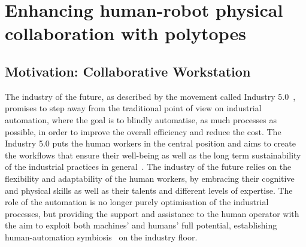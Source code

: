 
\chapter{Enhancing human-robot physical collaboration with polytopes}



\section{Motivation: Collaborative Workstation}
\label{ch:motivation_collaborative_workstation}
The industry of the future, as described by the movement called Industry 5.0~\cite{MADDIKUNTA2022ind50}, promises to step away from the traditional point of view on industrial automation, where the goal is to blindly automatise, as much processes as possible, in order to improve the overall efficiency and reduce the cost. The Industry 5.0 puts the human workers in the central position and aims to create the workflows that ensure their well-being as well as the long term sustainability of the industrial practices in general~\cite{XU2021ind50}. The industry of the future relies on the flexibility and adaptability of the human workers, by embracing their cognitive and physical skills as well as their talents and different levels of expertise. The role of the automation is no longer purely optimisation of the industrial processes, but providing the support and assistance to the human operator with the aim to exploit both machines' and humans' full potential, establishing human-automation symbiosis~\cite{LENG2022ind50} on the industry floor.
 
